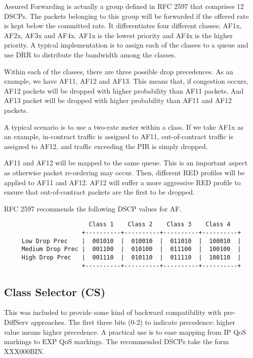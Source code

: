 Assured Forwarding is actually a group defined in RFC 2597 \cite{rfc2597} that comprises 12 DSCPs.
The packets belonging to this group will be forwarded if the offered rate is kept below the committed rate.
It differentiates four different classes: AF1x, AF2x, AF3x and AF4x.
AF1x is the lowest priority and AF4x is the higher priority.
A typical implementation is to assign each of the classes to a queue and use DRR to distribute the bandwidth among the classes.

Within each of the classes, there are three possible drop precedences.
As an example, we have AF11, AF12 and AF13.
This means that, if congestion occurs, AF12 packets will be dropped with higher probability than AF11 packets.
And AF13 packet will be dropped with higher probability than AF11 and AF12 packets.

A typical scenario is to use a two-rate meter within a class.
If we take AF1x as an example, in-contract traffic is assigned to AF11, out-of-contract traffic is assigned to AF12, and traffic exceeding the PIR is simply dropped.

AF11 and AF12 will be mapped to the same queue.
This is an important aspect as otherwise packet re-ordering may occur.
Then, different RED profiles will be applied to AF11 and AF12.
AF12 will suffer a more aggressive RED profile to ensure that out-of-contract packets are the first to be dropped.

RFC 2597 \cite{rfc2597} recommends the following DSCP values for AF.

{\scriptsize 
\begin{verbatim}
                        Class 1    Class 2    Class 3    Class 4
                      +----------+----------+----------+----------+
     Low Drop Prec    |  001010  |  010010  |  011010  |  100010  |
     Medium Drop Prec |  001100  |  010100  |  011100  |  100100  |
     High Drop Prec   |  001110  |  010110  |  011110  |  100110  |
                      +----------+----------+----------+----------+
\end{verbatim}
}

\subsection{Class Selector (CS)}
This was included to provide some kind of backward compatibility with pre-DiffServ approaches.
The first three bits (0-2) to indicate precedence: higher value means higher precedence.
A practical use is to ease mapping from IP QoS markings to EXP QoS markings.
The recommended DSCPs take the form XXX000BIN.

